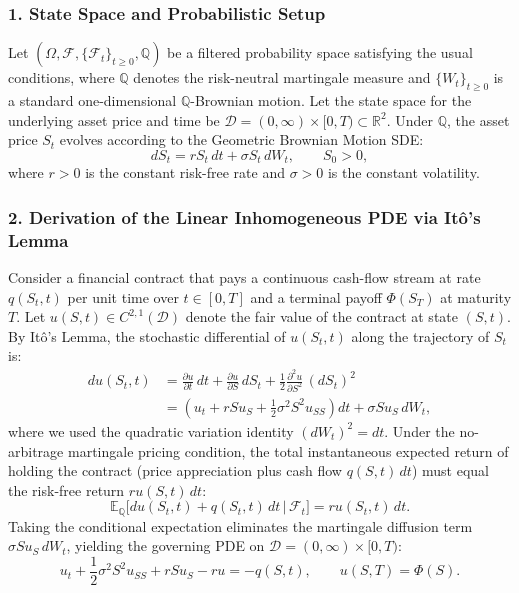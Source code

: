 \documentclass[11pt,a4paper]{article}
\begin{document}
\subsubsection*{1. State Space and Probabilistic Setup}
Let $(\Omega, \mathcal{F}, \{\mathcal{F}_t\}_{t \ge 0}, \mathbb{Q})$ be a filtered probability space satisfying the usual conditions, where $\mathbb{Q}$ denotes the risk-neutral martingale measure and $\{W_t\}_{t \ge 0}$ is a standard one-dimensional $\mathbb{Q}$-Brownian motion. Let the state space for the underlying asset price and time be $\mathcal{D} = (0, \infty) \times [0, T) \subset \mathbb{R}^2$. Under $\mathbb{Q}$, the asset price $S_t$ evolves according to the Geometric Brownian Motion SDE:
\[
    dS_t = r S_t\,dt + \sigma S_t\,dW_t, \qquad S_0 > 0,
\]
where $r > 0$ is the constant risk-free rate and $\sigma > 0$ is the constant volatility.

\subsubsection*{2. Derivation of the Linear Inhomogeneous PDE via It\^{o}'s Lemma}
Consider a financial contract that pays a continuous cash-flow stream at rate $q(S_t, t)$ per unit time over $t \in [0, T]$ and a terminal payoff $\Phi(S_T)$ at maturity $T$. Let $u(S, t) \in C^{2,1}(\mathcal{D})$ denote the fair value of the contract at state $(S, t)$. By It\^{o}'s Lemma, the stochastic differential of $u(S_t, t)$ along the trajectory of $S_t$ is:
\begin{align*}
    du(S_t, t) &= \frac{\partial u}{\partial t}\,dt + \frac{\partial u}{\partial S}\,dS_t + \frac{1}{2}\frac{\partial^2 u}{\partial S^2}\,(dS_t)^2 \\
    &= \left(u_t + r S u_S + \frac{1}{2}\sigma^2 S^2 u_{SS}\right)dt + \sigma S u_S\,dW_t,
\end{align*}
where we used the quadratic variation identity $(dW_t)^2 = dt$. Under the no-arbitrage martingale pricing condition, the total instantaneous expected return of holding the contract (price appreciation plus cash flow $q(S, t)\,dt$) must equal the risk-free return $r u(S, t)\,dt$:
\[
    \mathbb{E}_{\mathbb{Q}}\big[du(S_t, t) + q(S_t, t)\,dt \,\big|\, \mathcal{F}_t\big] = r u(S_t, t)\,dt.
\]
Taking the conditional expectation eliminates the martingale diffusion term $\sigma S u_S\,dW_t$, yielding the governing PDE on $\mathcal{D} = (0, \infty) \times [0, T)$:
\[
    u_t + \frac{1}{2}\sigma^2 S^2 u_{SS} + r S u_S - r u = -q(S, t), \qquad u(S, T) = \Phi(S).
\]
\end{document}
